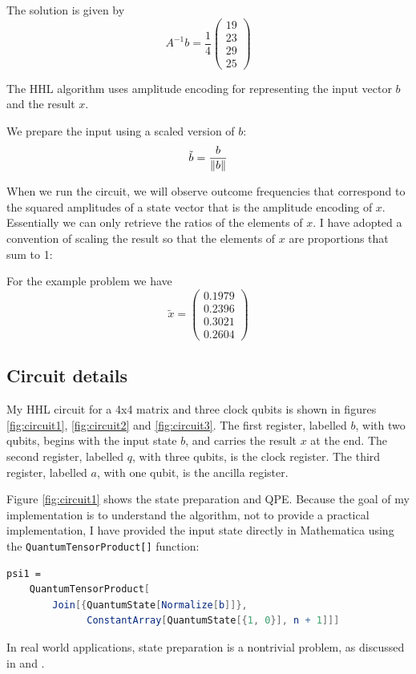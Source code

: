 \documentclass[12pt]{extarticle}
\begin{document}
The solution is given by
\begin{equation}\label{eq:solutionx4}
A^{-1}b = \frac{1}{4}\begin{pmatrix} 19 \\ 23 \\ 29 \\ 25 \end{pmatrix}
\end{equation}

The HHL algorithm uses amplitude encoding for representing the input vector $b$ and the result $x$.

We prepare the input using a scaled version of $b$:
\[
\tilde{b} = \frac{b}{\norm{b}}
\]

When we run the circuit, we will observe outcome frequencies that correspond to the squared amplitudes of a state vector
that is the amplitude encoding of $x$.
Essentially we can only retrieve the ratios of the elements of $x$.
I have adopted a convention of scaling the result so that the elements of $x$ are proportions that sum to 1:

For the example problem we have
\begin{equation}\label{eq:solutionx4num}
\tilde{x} = \begin{pmatrix} 0.1979 \\ 0.2396 \\ 0.3021 \\ 0.2604 \end{pmatrix}
\end{equation}

\subsection{Circuit details}

My HHL circuit for a 4x4 matrix and three clock qubits is shown in figures \ref{fig:circuit1}, \ref{fig:circuit2} and \ref{fig:circuit3}.
The first register, labelled $b$, with two qubits, begins with the input state $b$, and carries the result $x$ at the end.
The second register, labelled $q$, with three qubits, is the clock register.
The third register, labelled $a$, with one qubit, is the ancilla register.

Figure \ref{fig:circuit1} shows the state preparation and QPE.
Because the goal of my implementation is to understand the algorithm,
not to provide a practical implementation, I have provided the input state directly in Mathematica using the \texttt{QuantumTensorProduct[]} function:
\begin{lstlisting}[language=Mathematica]
psi1 =
    QuantumTensorProduct[
        Join[{QuantumState[Normalize[b]]},
              ConstantArray[QuantumState[{1, 0}], n + 1]]]
\end{lstlisting}
In real world applications, state preparation is a nontrivial problem, as discussed in \cite{aaronson2015read} and \cite{hhl2009}.
\end{document}
